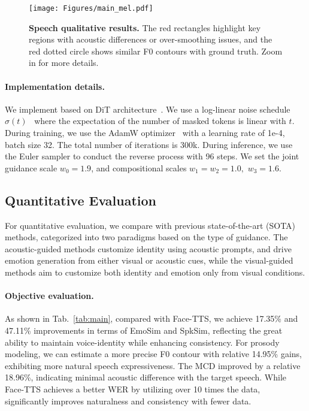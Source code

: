 \begin{figure*}[t]
    \centering
    \texttt{[image: Figures/main\_mel.pdf]}
    \caption{\textbf{Speech qualitative results.} The red rectangles highlight key regions with acoustic differences or over-smoothing issues, and the red dotted circle shows similar F0 contours with ground truth. Zoom in for more details.}
    \label{fig:mel}
\end{figure*}

\paragraph{Implementation details.~~\xspace}
We implement \methodname based on DiT architecture~\cite{DiT:conf/iccv/PeeblesX23}. We use a log-linear noise schedule $\sigma(t)$~\cite{SEDD:conf/icml/LouME24} where the expectation of the number of masked tokens is linear with $t$. During training, we use the AdamW optimizer~\cite{adamw/LoshchilovH19} with a learning rate of 1e-4, batch size 32. 
The total number of iterations is 300k. 
During inference, we use the Euler sampler to conduct the reverse process with 96 steps. We set the joint guidance scale $w_0=1.9$, and compositional scales $w_1=w_2=1.0,$ $w_3=1.6$. 

\subsection{Quantitative Evaluation}

For quantitative evaluation, we compare \methodname with previous state-of-the-art (SOTA) methods, categorized into two paradigms based on the type of guidance. 
The acoustic-guided methods customize identity using acoustic prompts, and drive emotion generation from either visual or acoustic cues, while the visual-guided methods aim to customize both identity and emotion only from visual conditions.

\paragraph{Objective evaluation.~~\xspace}
As shown in Tab.~\ref{tab:main}, compared with Face-TTS, we achieve 17.35\% and 47.11\% improvements in terms of EmoSim and SpkSim, reflecting the great ability to maintain voice-identity while enhancing consistency.
For prosody modeling, we can estimate a more precise F0 contour with relative 14.95\% gains, exhibiting more natural speech expressiveness. The MCD improved by a relative 18.96\%, indicating minimal acoustic difference with the target speech.
While Face-TTS achieves a better WER by utilizing over 10 times the data, \methodname significantly improves naturalness and consistency with fewer data. 


